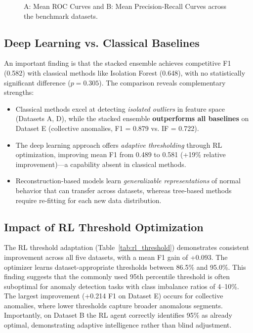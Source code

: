 \documentclass[conference]{IEEEtran}
\begin{document}
\begin{figure}[htbp]
{}
\caption{A: Mean ROC Curves and B: Mean Precision-Recall Curves across the benchmark datasets.}
\label{fig:roc_pr}
\end{figure}

\subsection{Deep Learning vs. Classical Baselines}

An important finding is that the stacked ensemble achieves competitive F1 (0.582) with classical methods like Isolation Forest (0.648), with no statistically significant difference ($p = 0.305$). The comparison reveals complementary strengths:

\begin{itemize}
    \item Classical methods excel at detecting \textit{isolated outliers} in feature space (Datasets A, D), while the stacked ensemble \textbf{outperforms all baselines} on Dataset E (collective anomalies, F1 = 0.879 vs. IF = 0.722).
    \item The deep learning approach offers \textit{adaptive thresholding} through RL optimization, improving mean F1 from 0.489 to 0.581 (+19\% relative improvement)---a capability absent in classical methods.
    \item Reconstruction-based models learn \textit{generalizable representations} of normal behavior that can transfer across datasets, whereas tree-based methods require re-fitting for each new data distribution.
\end{itemize}

\subsection{Impact of RL Threshold Optimization}

The RL threshold adaptation (Table~\ref{tab:rl_threshold}) demonstrates consistent improvement across all five datasets, with a mean F1 gain of +0.093. The optimizer learns dataset-appropriate thresholds between 86.5\% and 95.0\%. This finding suggests that the commonly used 95th percentile threshold is often suboptimal for anomaly detection tasks with class imbalance ratios of 4--10\%. The largest improvement (+0.214 F1 on Dataset E) occurs for collective anomalies, where lower thresholds capture broader anomalous segments. Importantly, on Dataset B the RL agent correctly identifies 95\% as already optimal, demonstrating adaptive intelligence rather than blind adjustment.
\end{document}
